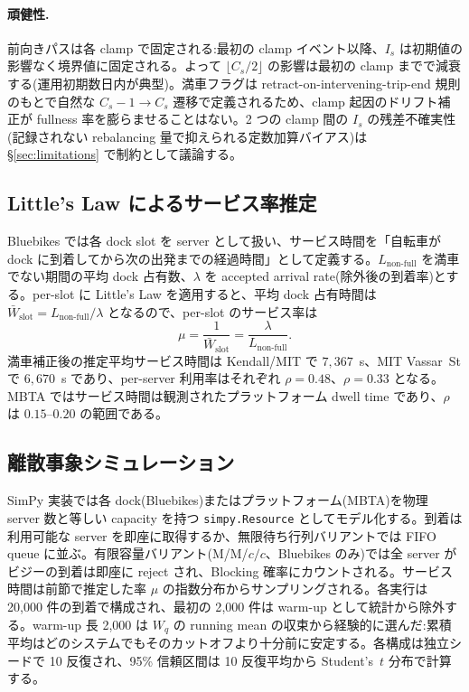 \paragraph{頑健性.} 前向きパスは各 clamp で固定される:最初の clamp イベント以降、$I_s$ は初期値の影響なく境界値に固定される。よって $\lfloor C_s/2 \rfloor$ の影響は最初の clamp までで減衰する(運用初期数日内が典型)。満車フラグは retract-on-intervening-trip-end 規則のもとで自然な $C_s-1 \to C_s$ 遷移で定義されるため、clamp 起因のドリフト補正が fullness 率を膨らませることはない。2 つの clamp 間の $I_s$ の残差不確実性(記録されない rebalancing 量で抑えられる定数加算バイアス)は \S\ref{sec:limitations} で制約として議論する。

\subsection{Little's Law によるサービス率推定}\label{app:service-rate}

Bluebikes では各 dock slot を server として扱い、サービス時間を「自転車が dock に到着してから次の出発までの経過時間」として定義する。$L_{\text{non-full}}$ を満車でない期間の平均 dock 占有数、$\lambda$ を accepted arrival rate(除外後の到着率)とする。per-slot に Little's Law を適用すると、平均 dock 占有時間は $\bar{W}_{\text{slot}} = L_{\text{non-full}}/\lambda$ となるので、per-slot のサービス率は
\[
\mu = \frac{1}{\bar{W}_{\text{slot}}} = \frac{\lambda}{L_{\text{non-full}}}.
\]
満車補正後の推定平均サービス時間は Kendall/MIT で $7{,}367$~s、MIT Vassar~St で $6{,}670$~s であり、per-server 利用率はそれぞれ $\rho = 0.48$、$\rho = 0.33$ となる。MBTA ではサービス時間は観測されたプラットフォーム dwell time であり、$\rho$ は $0.15$--$0.20$ の範囲である。

\subsection{離散事象シミュレーション}\label{app:des}

SimPy 実装では各 dock(Bluebikes)またはプラットフォーム(MBTA)を物理 server 数と等しい capacity を持つ \texttt{simpy.Resource} としてモデル化する。到着は利用可能な server を即座に取得するか、無限待ち行列バリアントでは FIFO queue に並ぶ。有限容量バリアント(M/M/$c/c$、Bluebikes のみ)では全 server がビジーの到着は即座に reject され、Blocking 確率にカウントされる。サービス時間は前節で推定した率 $\mu$ の指数分布からサンプリングされる。各実行は 20{,}000 件の到着で構成され、最初の 2{,}000 件は warm-up として統計から除外する。warm-up 長 2{,}000 は $W_q$ の running mean の収束から経験的に選んだ:累積平均はどのシステムでもそのカットオフより十分前に安定する。各構成は独立シードで 10 反復され、95\% 信頼区間は 10 反復平均から Student's~$t$ 分布で計算する。

